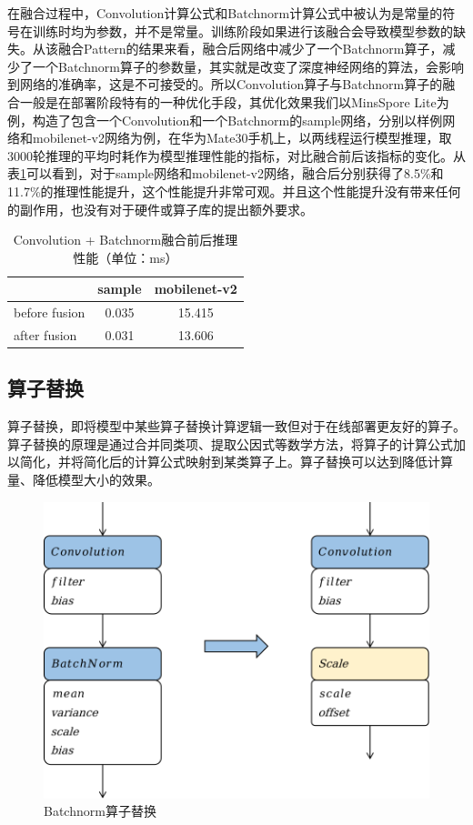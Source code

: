 在融合过程中，Convolution计算公式和Batchnorm计算公式中被认为是常量的符号在训练时均为参数，并不是常量。训练阶段如果进行该融合会导致模型参数的缺失。从该融合Pattern的结果来看，融合后网络中减少了一个Batchnorm算子，减少了一个Batchnorm算子的参数量，其实就是改变了深度神经网络的算法，会影响到网络的准确率，这是不可接受的。所以Convolution算子与Batchnorm算子的融合一般是在部署阶段特有的一种优化手段，其优化效果我们以MinsSpore Lite为例，构造了包含一个Convolution和一个Batchnorm的sample网络，分别以样例网络和mobilenet-v2网络为例，在华为Mate30手机上，以两线程运行模型推理，取3000轮推理的平均时耗作为模型推理性能的指标，对比融合前后该指标的变化。从表\ref{tab:ch09/ch09-conv-bn-fusion}可以看到，对于sample网络和mobilenet-v2网络，融合后分别获得了8.5\%和11.7\%的推理性能提升，这个性能提升非常可观。并且这个性能提升没有带来任何的副作用，也没有对于硬件或算子库的提出额外要求。

\begin{table}
\centering
\caption{Convolution + Batchnorm融合前后推理性能（单位：ms）}
\label{tab:ch09/ch09-conv-bn-fusion}
\begin{tabular}{|l|c|c|}
\hline
&sample&mobilenet-v2\\
\hline
before fusion&0.035&15.415\\
after fusion&0.031&13.606\\
\hline
\end{tabular}
\end{table}

\subsection{算子替换}
算子替换，即将模型中某些算子替换计算逻辑一致但对于在线部署更友好的算子。算子替换的原理是通过合并同类项、提取公因式等数学方法，将算子的计算公式加以简化，并将简化后的计算公式映射到某类算子上。算子替换可以达到降低计算量、降低模型大小的效果。

\begin{figure}[h]
\centering
\includegraphics[scale=0.6]{figs/ch09/ch09-bn-replace.png}
\caption{Batchnorm算子替换}
\label{fig:ch09/ch09-bn-replace}
\end{figure}

